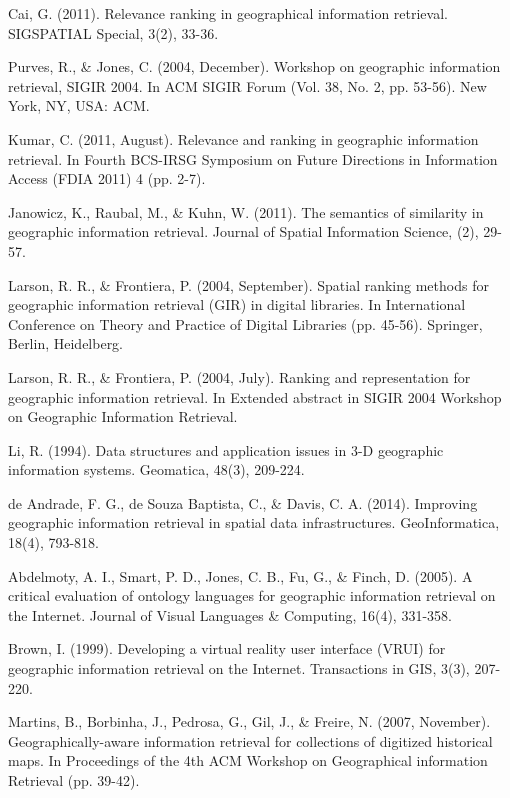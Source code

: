 \documentclass{llncs}
\begin{document}
\begin{thebibliography}{}
Cai, G. (2011). Relevance ranking in geographical information retrieval.
SIGSPATIAL Special, 3(2), 33-36.

Purves, R., \& Jones, C. (2004, December). Workshop on geographic information
retrieval, SIGIR 2004. In ACM SIGIR Forum (Vol. 38, No. 2, pp. 53-56). New
York, NY, USA: ACM.

Kumar, C. (2011, August). Relevance and ranking in geographic information
retrieval. In Fourth BCS-IRSG Symposium on Future Directions in Information
Access (FDIA 2011) 4 (pp. 2-7).

Janowicz, K., Raubal, M., \& Kuhn, W. (2011). The semantics of similarity in
geographic information retrieval. Journal of Spatial Information Science, (2),
29-57.

Larson, R. R., \& Frontiera, P. (2004, September). Spatial ranking methods for
geographic information retrieval (GIR) in digital libraries. In International
Conference on Theory and Practice of Digital Libraries (pp. 45-56). Springer,
Berlin, Heidelberg.

Larson, R. R., \& Frontiera, P. (2004, July). Ranking and representation for
geographic information retrieval. In Extended abstract in SIGIR 2004 Workshop
on Geographic Information Retrieval.

Li, R. (1994). Data structures and application issues in 3-D geographic
information systems. Geomatica, 48(3), 209-224.

de Andrade, F. G., de Souza Baptista, C., \& Davis, C. A. (2014). Improving
geographic information retrieval in spatial data infrastructures.
GeoInformatica, 18(4), 793-818.

Abdelmoty, A. I., Smart, P. D., Jones, C. B., Fu, G., \& Finch, D. (2005). A
critical evaluation of ontology languages for geographic information retrieval
on the Internet. Journal of Visual Languages \& Computing, 16(4), 331-358.

Brown, I. (1999). Developing a virtual reality user interface (VRUI) for
geographic information retrieval on the Internet. Transactions in GIS, 3(3),
207-220.

Martins, B., Borbinha, J., Pedrosa, G., Gil, J., \& Freire, N. (2007, November).
Geographically-aware information retrieval for collections of digitized
historical maps. In Proceedings of the 4th ACM Workshop on Geographical
information Retrieval (pp. 39-42).


\end{thebibliography}
\end{document}
